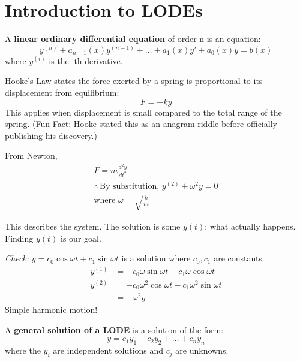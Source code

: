 \documentclass[../main.tex]{subfiles}
\begin{document}

\section{Introduction to LODEs}

\begin{definition}
    A \textbf{linear ordinary differential equation} of order n is an equation:
    \[ y^{(n)}+a_{n-1}(x)y^{(n-1)}+\dots+a_{1}(x)y'+a_{0}(x)y=b(x)  \]
    where $y^{(i)}$ is the ith derivative.
\end{definition}

\begin{example}
    Hooke's Law states the force exerted by a spring is proportional to its displacement from equilibrium:
    \[ F = -ky \]
    This applies when displacement is small compared to the total range of the spring.
    (Fun Fact: Hooke stated this as an anagram riddle before officially publishing his discovery.)

    From Newton,
    \begin{gather*}
        F = m\frac{d^2y}{dt^2} \\
        \therefore \, \text{By substitution, } y^{(2)}+\omega^2y=0 \\
        \text{where } \omega =\sqrt{ \frac{k}{m} }
    \end{gather*}

    This describes the system. The solution is some \(y(t)\): what actually happens. Finding \(y(t)\) is our goal.

    \textit{Check:} \(y=c_{0}\cos \omega t+c_{1}\sin \omega t\) is a solution where \(c_{0},c_{1}\) are constants.
    \begin{align*}
        y^{(1)} & = -c_{0}\omega \sin \omega t+c_{1}\omega \cos \omega t \\
        y^{(2)} & = -c_{0}\omega^2\cos \omega t-c_{1}\omega^2\sin \omega t \\
        & = -\omega^2 y
    \end{align*}
    Simple harmonic motion!
\end{example}

\begin{definition}
    A \textbf{general solution of a LODE} is a solution of the form:
    \[ y = c_{1}y_{1}+c_{2}y_{2}+\dots+c_{n}y_{n} \]
    where the \(y_{i}\) are independent solutions and \(c_{j}\) are unknowns.
\end{definition}
\end{document}
